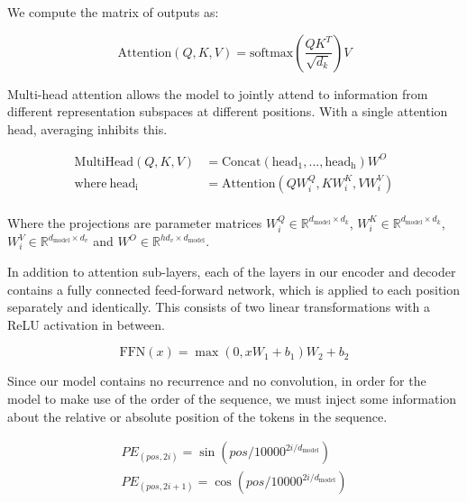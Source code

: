 \documentclass{article}
\newcommand{\dmodel}{d_{\text{model}}}
\begin{document}
We compute the matrix of outputs as:

\begin{equation}
   \mathrm{Attention}(Q, K, V) = \mathrm{softmax}\left(\frac{QK^T}{\sqrt{d_k}}\right)V
\end{equation}

Multi-head attention allows the model to jointly attend to information from different representation subspaces at different positions. With a single attention head, averaging inhibits this.

\begin{align*}
    \mathrm{MultiHead}(Q, K, V) &= \mathrm{Concat}(\mathrm{head_1}, ..., \mathrm{head_h})W^O\\
    \text{where}~\mathrm{head_i} &= \mathrm{Attention}(QW^Q_i, KW^K_i, VW^V_i)\\
\end{align*}

Where the projections are parameter matrices $W^Q_i \in \mathbb{R}^{\dmodel \times d_k}$, $W^K_i \in \mathbb{R}^{\dmodel \times d_k}$, $W^V_i \in \mathbb{R}^{\dmodel \times d_v}$ and $W^O \in \mathbb{R}^{hd_v \times \dmodel}$.

In addition to attention sub-layers, each of the layers in our encoder and decoder contains a fully connected feed-forward network, which is applied to each position separately and identically.  This consists of two linear transformations with a ReLU activation in between.

\begin{equation}
   \mathrm{FFN}(x)=\max(0, xW_1 + b_1) W_2 + b_2
\end{equation}

Since our model contains no recurrence and no convolution, in order for the model to make use of the order of the sequence, we must inject some information about the relative or absolute position of the tokens in the sequence.

\begin{align*}
    PE_{(pos,2i)} = \sin(pos / 10000^{2i/\dmodel}) \\
    PE_{(pos,2i+1)} = \cos(pos / 10000^{2i/\dmodel})
\end{align*}
\end{document}
